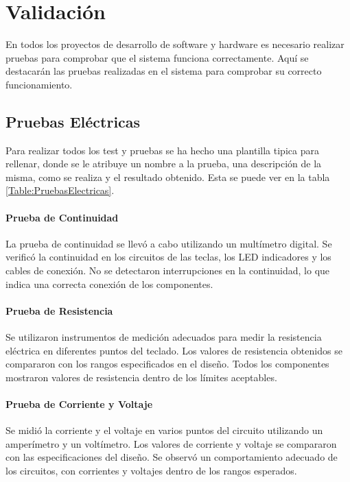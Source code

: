 \chapter{Validación}

En todos los proyectos de desarrollo de software y hardware es necesario realizar pruebas para comprobar que el sistema funciona correctamente. Aquí se destacarán las pruebas realizadas en el sistema para comprobar su correcto funcionamiento.

\section{Pruebas Eléctricas}
Para realizar todos los test y pruebas se ha hecho una plantilla tipica para rellenar, donde se le atribuye un nombre a la prueba, una descripción de la misma, como se realiza y el resultado obtenido. Esta se puede ver en la tabla \ref{Table:PruebasElectricas}.

\subsubsection{Prueba de Continuidad}

La prueba de continuidad se llevó a cabo utilizando un multímetro digital. Se verificó la continuidad en los circuitos de las teclas, los \gls{LED} indicadores y los cables de conexión. No se detectaron interrupciones en la continuidad, lo que indica una correcta conexión de los componentes.

\subsubsection{Prueba de Resistencia}

Se utilizaron instrumentos de medición adecuados para medir la resistencia eléctrica en diferentes puntos del teclado. Los valores de resistencia obtenidos se compararon con los rangos especificados en el diseño. Todos los componentes mostraron valores de resistencia dentro de los límites aceptables.

\subsubsection{Prueba de Corriente y Voltaje}

Se midió la corriente y el voltaje en varios puntos del circuito utilizando un amperímetro y un voltímetro. Los valores de corriente y voltaje se compararon con las especificaciones del diseño. Se observó un comportamiento adecuado de los circuitos, con corrientes y voltajes dentro de los rangos esperados.

